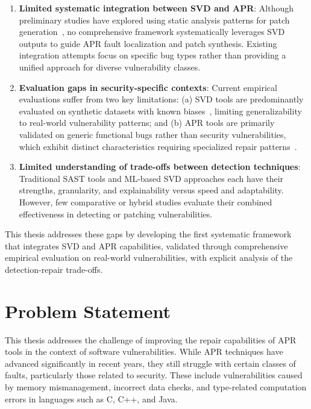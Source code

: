 \begin{enumerate}
    \item \textbf{Limited systematic integration between SVD and APR}: Although preliminary studies have explored using static analysis patterns for patch generation~\cite{Liu2018AVATARF,AlBataineh2021TowardsMR}, no comprehensive framework systematically leverages SVD outputs to guide APR fault localization and patch synthesis. Existing integration attempts focus on specific bug types rather than providing a unified approach for diverse vulnerability classes.
    \item \textbf{Evaluation gaps in security-specific contexts}: Current empirical evaluations suffer from two key limitations: (a) SVD tools are predominantly evaluated on synthetic datasets with known biases~\cite{Guo2024DataQI}, limiting generalizability to real-world vulnerability patterns; and (b) APR tools are primarily validated on generic functional bugs rather than security vulnerabilities, which exhibit distinct characteristics requiring specialized repair patterns~\cite{apr4vul}.
    \item \textbf{Limited understanding of trade-offs between detection techniques}: Traditional SAST tools and ML-based SVD approaches each have their strengths, granularity, and explainability versus speed and adaptability. However, few comparative or hybrid studies evaluate their combined effectiveness in detecting or patching vulnerabilities.
\end{enumerate}

This thesis addresses these gaps by developing the first systematic framework that integrates SVD and APR capabilities, validated through comprehensive empirical evaluation on real-world vulnerabilities, with explicit analysis of the detection-repair trade-offs.

\section{Problem Statement} \label{sec:ae3}

This thesis addresses the challenge of improving the repair capabilities of APR tools in the context of software vulnerabilities. While APR techniques have advanced significantly in recent years, they still struggle with certain classes of faults, particularly those related to security. These include vulnerabilities caused by memory mismanagement, incorrect data checks, and type-related computation errors in languages such as C, C++, and Java.

